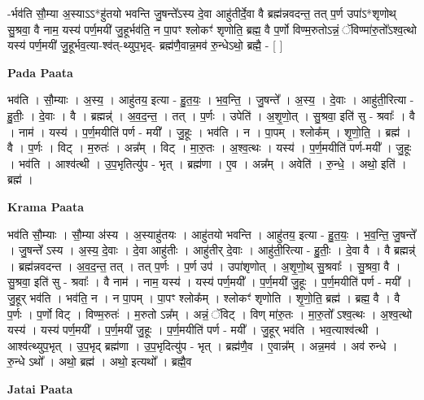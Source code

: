 \documentclass[17pt]{extarticle}
\begin{document}
-र्भव॑ति सौ॒म्या अ॒स्याऽऽ*हु॑तयो भवन्ति जु॒षन्ते᳚ऽस्य दे॒वा आहु॑तीर्दे॒वा वै ब्रह्म॑न्नवदन्त॒ तत् प॒र्ण उपा॑ऽ*शृणोथ् सु॒श्रवा॒ वै नाम॒ यस्य॑ पर्ण॒मयी॑ जु॒हूर्भव॑ति॒ न पा॒पꣳ श्लोकꣳ॑ शृणोति॒ ब्रह्म॒ वै प॒र्णो विण्म॒रुतोऽन्नं॒ ॅविण्मा॑रु॒तो᳚ऽश्व॒त्थो यस्य॑ पर्ण॒मयी॑ जु॒हूर्भव॒त्या-श्व॑त्-थ्युप॒भृद्- ब्रह्म॑णै॒वान्न॒मव॑ रु॒न्धेऽथो॒ ब्रह्मै॒ - [  ] \newline

\textbf{Pada Paata} \newline

भव॑ति । सौ॒म्याः । अ॒स्य॒ । आहु॑तय॒ इत्या - हु॒त॒यः॒ । भ॒व॒न्ति॒ । जु॒षन्ते᳚ । अ॒स्य॒ । दे॒वाः । आहु॑ती॒रित्या - हु॒तीः॒ । दे॒वाः । वै । ब्रह्मन्न्॑ । अ॒व॒द॒न्त॒ । तत् । प॒र्णः । उपेति॑ । अ॒शृ॒णो॒त् । सु॒श्रवा॒ इति॑ सु - श्रवाः᳚ । वै । नाम॑ । यस्य॑ । प॒र्ण॒मयीति॑ पर्ण - मयी᳚ । जु॒हूः । भव॑ति । न । पा॒पम् । श्लोक᳚म् । शृ॒णो॒ति॒ । ब्रह्म॑ । वै । प॒र्णः । विट् । म॒रुतः॑ । अन्न᳚म् । विट् । मा॒रु॒तः । अ॒श्व॒त्थः । यस्य॑ । प॒र्ण॒मयीति॑ पर्ण-मयी᳚ । जु॒हूः । भव॑ति । आश्व॑त्थी । उ॒प॒भृतित्यु॑प - भृत् । ब्रह्म॑णा । ए॒व । अन्न᳚म् । अवेति॑ । रु॒न्धे॒ । अथो॒ इति॑ । ब्रह्म॑ ।  \newline


\textbf{Krama Paata} \newline

भव॑ति सौ॒म्याः । सौ॒म्या अ॑स्य । अ॒स्याहु॑तयः । आहु॑तयो भवन्ति । आहु॑तय॒ इत्या - हु॒त॒यः॒ । भ॒व॒न्ति॒ जु॒षन्ते᳚ । जु॒षन्ते᳚ ऽस्य । अ॒स्य॒ दे॒वाः । दे॒वा आहु॑तीः । आहु॑तीर् दे॒वाः । आहु॑ती॒रित्या - हु॒तीः॒ । दे॒वा वै । वै ब्रह्मन्न्॑ । ब्रह्म॑न्नवदन्त । अ॒व॒द॒न्त॒ तत् । तत् प॒र्णः । प॒र्ण उप॑ । उपा॑शृणोत् । अ॒शृ॒णो॒थ् सु॒श्रवाः᳚ । सु॒श्रवा॒ वै । सु॒श्रवा॒ इति॑ सु - श्रवाः᳚ । वै नाम॑ । नाम॒ यस्य॑ । यस्य॑ पर्ण॒मयी᳚ । प॒र्ण॒मयी॑ जु॒हूः । प॒र्ण॒मयीति॑ पर्ण - मयी᳚ । जु॒हूर् भव॑ति । भव॑ति॒ न । न पा॒पम् । पा॒पꣳ श्लोक᳚म् । श्लोकꣳ॑ शृणोति । शृ॒णो॒ति॒ ब्रह्म॑ । ब्रह्म॒ वै । वै प॒र्णः । प॒र्णो विट् । विण्म॒रुतः॑ । म॒रुतो ऽन्न᳚म् । अन्नं॒ ॅविट् । विण् मा॑रु॒तः । मा॒रु॒तो᳚ ऽश्व॒त्थः । अ॒श्व॒त्थो यस्य॑ । यस्य॑ पर्ण॒मयी᳚ । प॒र्ण॒मयी॑ जु॒हूः । प॒र्ण॒मयीति॑ पर्ण - मयी᳚ । जु॒हूर् भव॑ति । भव॒त्याश्व॑त्थी । आश्व॑त्थ्युप॒भृत् । उ॒प॒भृद् ब्रह्म॑णा । उ॒प॒भृदित्यु॑प - भृत् । ब्रह्म॑णै॒व । ए॒वान्न᳚म् । अन्न॒मव॑ । अव॑ रुन्धे । रु॒न्धे ऽथो᳚ । अथो॒ ब्रह्म॑ । अथो॒ इत्यथो᳚ । ब्रह्मै॒व \newline

\textbf{Jatai Paata} \newline
\end{document}
